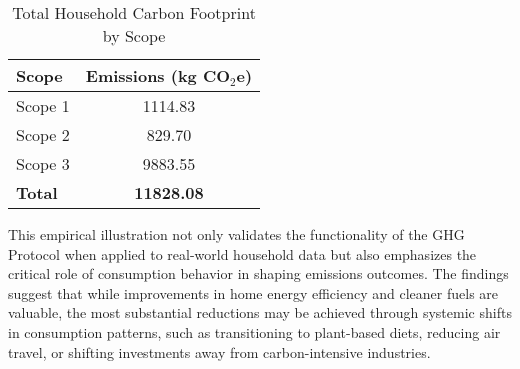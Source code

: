\documentclass[12pt,a4paper]{article}
\begin{document}
\begin{table}[h]
\centering
\caption{Total Household Carbon Footprint by Scope}
\label{tab:total_emissions}
\begin{tabular}{|l|c|}
\hline
\textbf{Scope} & \textbf{Emissions (kg CO$_2$e)} \\
\hline
Scope 1 & 1114.83 \\
Scope 2 & 829.70 \\
Scope 3 & 9883.55 \\
\textbf{Total} & \textbf{11828.08} \\
\hline
\end{tabular}
\end{table}

This empirical illustration not only validates the functionality of the GHG Protocol when applied to real-world household data but also emphasizes the critical role of consumption behavior in shaping emissions outcomes. The findings suggest that while improvements in home energy efficiency and cleaner fuels are valuable, the most substantial reductions may be achieved through systemic shifts in consumption patterns, such as transitioning to plant-based diets, reducing air travel, or shifting investments away from carbon-intensive industries.
\end{document}
